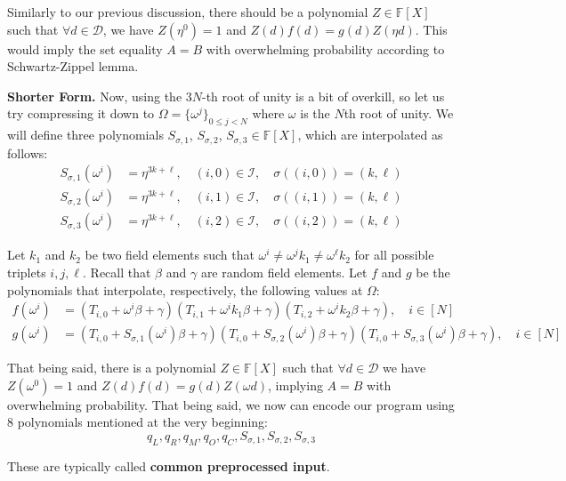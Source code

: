 \documentclass[../lecture-notes.tex]{subfiles}
\begin{document}
Similarly to our previous discussion, there should be a polynomial $Z \in
\mathbb{F}[X]$ such that $\forall d \in \mathcal{D}$, we have $Z(\eta^{0}) = 1$ and
$Z(d)f(d) = g(d)Z(\eta d)$. This would imply the set equality $A=B$ with
overwhelming probability according to Schwartz-Zippel lemma.

\textbf{Shorter Form.} Now, using the $3N$-th root of unity is a bit of overkill,
so let us try compressing it down to $\Omega = \{\omega^j\}_{0 \leq j < N}$
where $\omega$ is the $N$th root of unity. We will define three polynomials
$S_{\sigma,1}$, $S_{\sigma,2}$, $S_{\sigma,3} \in \mathbb{F}[X]$, which are
interpolated as follows:
\begin{align*}
    S_{\sigma,1}(\omega^i) &= \eta^{3k+\ell}, \quad (i, 0) \in \mathcal{I}, \quad \sigma((i, 0)) = (k, \ell) \\
    S_{\sigma,2}(\omega^i) &= \eta^{3k+\ell}, \quad (i, 1) \in \mathcal{I}, \quad \sigma((i, 1)) = (k, \ell) \\
    S_{\sigma,3}(\omega^i) &= \eta^{3k+\ell}, \quad (i, 2) \in \mathcal{I}, \quad \sigma((i, 2)) = (k, \ell)
\end{align*}

Let $k_1$ and $k_2$ be two field elements such that $\omega^i \neq \omega^j k_1
\neq \omega^{\ell} k_2$ for all possible triplets $i, j, \ell$. Recall that
$\beta$ and $\gamma$ are random field elements. Let $f$ and $g$ be the
polynomials that interpolate, respectively, the following values at $\Omega$:
\begin{align*}
    f(\omega^i) &=\left(T_{i,0} + \omega^i \beta + \gamma\right)\left(T_{i,1} + \omega^i k_1 \beta + \gamma\right)\left(T_{i,2} + \omega^i k_2 \beta + \gamma\right), \quad i \in [N] \\
    g(\omega^i) &= \left(T_{i,0} + S_{\sigma,1}(\omega^i) \beta + \gamma\right)\left(T_{i,0} + S_{\sigma,2}(\omega^i) \beta + \gamma\right)\left(T_{i,0} + S_{\sigma,3}(\omega^i) \beta + \gamma\right), \quad i \in [N]
\end{align*}

That being said, there is a polynomial $Z \in \mathbb{F}[X]$ such that $\forall
d \in \mathcal{D}$ we have $Z(\omega^{0}) = 1$ and $Z(d)f(d) = g(d)Z(\omega d)$,
implying $A = B$ with overwhelming probability. That being said, we now can
encode our program using 8 polynomials mentioned at the very beginning:
\[q_L, q_R, q_M, q_O, q_C, S_{\sigma,1}, S_{\sigma,2}, S_{\sigma,3}\]

These are typically called \textbf{common preprocessed input}.
\end{document}
